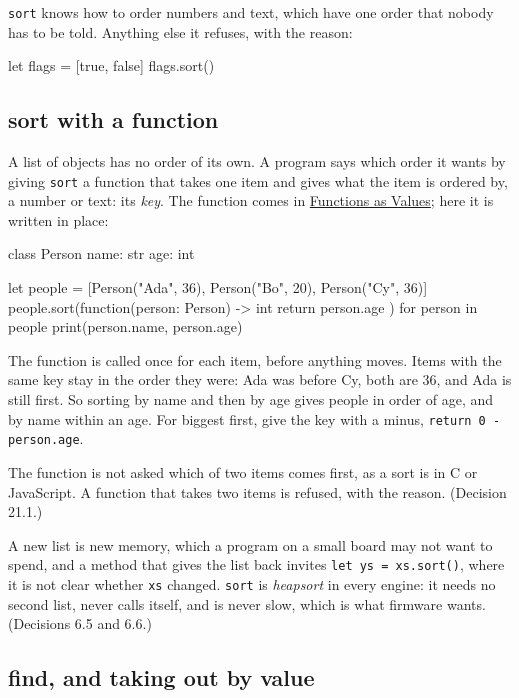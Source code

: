 \verb|sort| knows how to order numbers and text, which have one order
that nobody has to be told. Anything else it refuses, with the reason:

\begin{zeno}[fails=yes]
let flags = [true, false]
flags.sort()
\end{zeno}

\subsection{sort with a function}

A list of objects has no order of its own. A program says which order
it wants by giving \verb|sort| a function that takes one item and gives
what the item is ordered by, a number or text: its \emph{key}. The
function comes in \hyperref[ch-function-values]{Functions as Values};
here it is written in place:

\begin{zeno}
class Person {
    name: str
    age: int
}

let people = [Person("Ada", 36), Person("Bo", 20), Person("Cy", 36)]
people.sort(function(person: Person) -> int { return person.age })
for person in people {
    print(person.name, person.age)
}
\end{zeno}

The function is called once for each item, before anything moves.
Items with the same key stay in the order they were: Ada was before
Cy, both are 36, and Ada is still first. So sorting by name and then
by age gives people in order of age, and by name within an age. For
biggest first, give the key with a minus, \verb|return 0 - person.age|.

The function is not asked which of two items comes first, as a sort
is in C or JavaScript. A function that takes two items is refused,
with the reason. (Decision 21.1.)

\begin{why}
A new list is new memory, which a program on a small board may not
want to spend, and a method that gives the list back invites
\verb|let ys = xs.sort()|, where it is not clear whether \verb|xs|
changed. \verb|sort| is \emph{heapsort} in every engine: it needs no
second list, never calls itself, and is never slow, which is what
firmware wants. (Decisions 6.5 and 6.6.)
\end{why}

\subsection{find, and taking out by value}

